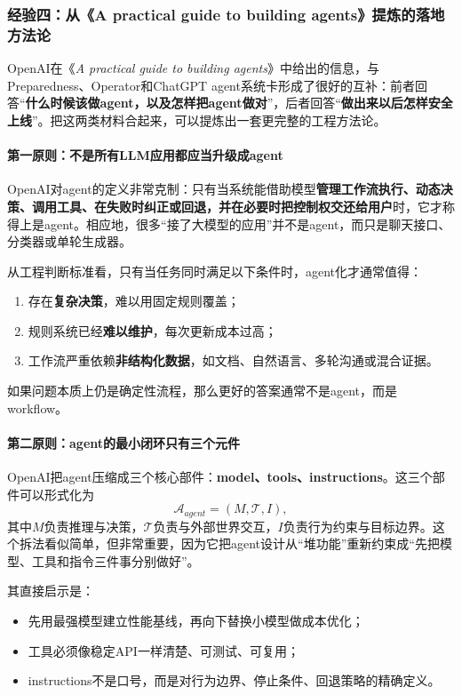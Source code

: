 \documentclass[12pt,a4paper]{article}
\begin{document}
\subsubsection{经验四：从《A practical guide to building agents》提炼的落地方法论}

OpenAI在《\textit{A practical guide to building agents}》中给出的信息，与Preparedness、Operator和ChatGPT agent系统卡形成了很好的互补：前者回答“\textbf{什么时候该做agent，以及怎样把agent做对}”，后者回答“\textbf{做出来以后怎样安全上线}”。把这两类材料合起来，可以提炼出一套更完整的工程方法论。

\paragraph{第一原则：不是所有LLM应用都应当升级成agent}

OpenAI对agent的定义非常克制：只有当系统能借助模型\textbf{管理工作流执行、动态决策、调用工具、在失败时纠正或回退，并在必要时把控制权交还给用户}时，它才称得上是agent。相应地，很多“接了大模型的应用”并不是agent，而只是聊天接口、分类器或单轮生成器。

从工程判断标准看，只有当任务同时满足以下条件时，agent化才通常值得：
\begin{enumerate}
    \item 存在\textbf{复杂决策}，难以用固定规则覆盖；
    \item 规则系统已经\textbf{难以维护}，每次更新成本过高；
    \item 工作流严重依赖\textbf{非结构化数据}，如文档、自然语言、多轮沟通或混合证据。
\end{enumerate}
如果问题本质上仍是确定性流程，那么更好的答案通常不是agent，而是workflow。

\paragraph{第二原则：agent的最小闭环只有三个元件}

OpenAI把agent压缩成三个核心部件：\textbf{model、tools、instructions}。这三个部件可以形式化为
\begin{equation}
\mathcal{A}_{agent} = (M, \mathcal{T}, I),
\end{equation}
其中$M$负责推理与决策，$\mathcal{T}$负责与外部世界交互，$I$负责行为约束与目标边界。这个拆法看似简单，但非常重要，因为它把agent设计从“堆功能”重新约束成“先把模型、工具和指令三件事分别做好”。

其直接启示是：
\begin{itemize}
    \item 先用最强模型建立性能基线，再向下替换小模型做成本优化；
    \item 工具必须像稳定API一样清楚、可测试、可复用；
    \item instructions不是口号，而是对行为边界、停止条件、回退策略的精确定义。
\end{itemize}
\end{document}
